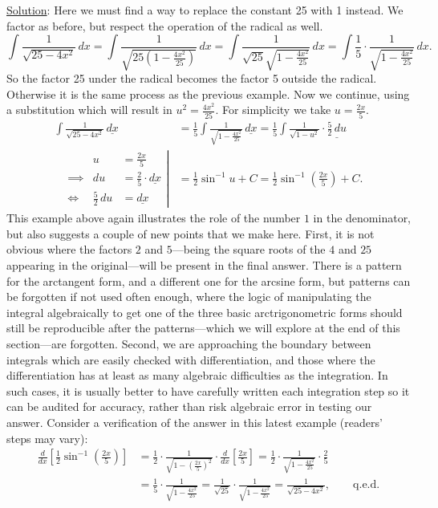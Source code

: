 \underline{Solution}: Here we must find a way to replace the 
constant 25 with 1 instead.  We factor as before, but respect
the operation of the radical as well.
$$\int\frac1{\sqrt{25-4x^2}}\,dx
=\int\frac1{\sqrt{25\left(1-\frac{4x^2}{25}\right)}}\,dx
=\int\frac1{\sqrt{25}\sqrt{1-\frac{4x^2}{25}}}\,dx
=\int\frac15\cdot\frac1{\sqrt{1-\frac{4x^2}{25}}}\,dx.$$
So the factor 25 under the radical becomes the factor 5 outside
the radical.  Otherwise it is the same process as the previous
example.  Now we continue, using a substitution which will
result in $u^2=\frac{4x^2}{25}$.  For simplicity we take $u=\frac{2x}5$.
\begin{align*}
\int\frac1{\sqrt{25-4x^2}}\,\underline{dx}
 &=\frac15\int\frac1{\sqrt{1-\frac{4x^2}{25}}}\,\underline{dx}
 =\frac15\int\frac1{\sqrt{1-u^2}}\cdot\underline{\frac52\,du}\\
\left.\begin{alignedat}{2}
&&u&=\frac{2x}5\\
&\implies&du&=\frac25\cdot\underline{dx}\\
&\iff&\frac52\,du&=\underline{dx}\end{alignedat}\right|
&=\frac12\sin^{-1}u+C=\frac12\sin^{-1}\left(\frac{2x}5\right)+C.
\end{align*}
\eex
This example above again illustrates the role of the number $1$
in the denominator, but also
suggests a couple of new points that we make here.
First, it is not obvious where the factors $2$ and $5$---being
the square roots of the $4$ and $25$ appearing in the original---will
be present in the final answer.  There is a pattern for the
arctangent form, and a different one for the arcsine form, but
patterns can be forgotten if not used often enough, where the logic
of manipulating the integral algebraically to get one of the
three basic arctrigonometric forms should still be reproducible
after the patterns---which we will explore at the end of this 
section---are forgotten.  Second, we are approaching the
boundary between integrals which are easily checked with 
differentiation, and those where the differentiation has at least
as many algebraic difficulties as the integration.  In such cases,
it is usually better to have carefully written each integration step so it
can be audited for accuracy, rather than risk algebraic error in
testing our answer.  Consider a verification of the answer in this
latest example (readers' steps may vary):
\begin{align*}
\frac{d}{dx}\left[\frac12\sin^{-1}\left(\frac{2x}5\right)\right]
&=\frac12\cdot\frac1{\sqrt{1-\left(\frac{2x}{5}\right)^2}}
 \cdot\frac{d}{dx}\left[\frac{2x}5\right]
=\frac12\cdot\frac1{\sqrt{1-\frac{4x^2}{25}}}\cdot\frac25\\
&=\frac15\cdot\frac1{\sqrt{1-\frac{4x^2}{25}}}
=\frac1{\sqrt{25}}\cdot\frac1{\sqrt{1-\frac{4x^2}{25}}}
=\frac1{\sqrt{25-4x^2}},\qquad\text{q.e.d.}
\end{align*}

